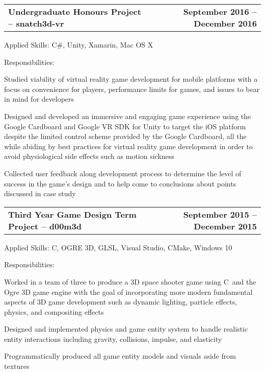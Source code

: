 \documentclass[10pt,letterpaper]{article}
\makeatletter
\newenvironment{indentsection}[1]%
{\begin{list}{}%
  {\setlength{\leftmargin}{#1}}%
  \item[]%
}
{\end{list}}
\newcommand{\headerrow}[2]
{\begin{tabular*}{\linewidth}{l@{\extracolsep{\fill}}r}
  #1 &
  #2 \\
\end{tabular*}}
\newcommand{\CPP}
{C\nolinebreak[4]\hspace{-.05em}\raisebox{.22ex}{\footnotesize\bf ++}}
\makeatother
\begin{document}
\begin{itemize}
  \item
  \headerrow
    {\textbf{Undergraduate Honours Project -- snatch3d-vr}}
    {\textbf{September 2016 -- December 2016}}
  \begin{indentsection}{1em}
    \begin{description*}
      \item[Applied Skills:]
      C\#, Unity, Xamarin, Mac OS X
      \item[Responsibilities:]
      \hfill
      \begin{itemize*}
        \item Studied viability of virtual reality game development for mobile
        platforms with a focus on convenience for players, performance limits for
        games, and issues to bear in mind for developers
        \item Designed and developed an immersive and engaging game experience
        using the Google Cardboard and Google VR SDK for Unity to target the iOS
        platform despite the limited control scheme provided by the Google
        Cardboard, all the while abiding by best practices for virtual reality
        game development in order to avoid physiological side effects such as
        motion sickness
        \item Collected user feedback along development process to determine the
        level of success in the game’s design and to help come to conclusions
        about points discussed in case study
      \end{itemize*}
    \end{description*}
  \end{indentsection}

  \item
  \headerrow
    {\textbf{Third Year Game Design Term Project -- d00m3d}}
    {\textbf{September 2015 -- December 2015}}
  \begin{indentsection}{1em}
    \begin{description*}
      \item[Applied Skills:]
      \CPP, OGRE 3D, GLSL, Visual Studio, CMake, Windows 10
      \item[Responsibilities:]
      \hfill
      \begin{itemize*}
        \item Worked in a team of three to produce a 3D space shooter game using
        \CPP\ and the Ogre 3D game engine with the goal of incorporating more
        modern fundamental aspects of 3D game development such as dynamic
        lighting, particle effects, physics, and compositing effects
        \item Designed and implemented physics and game entity system to handle
        realistic entity interactions including gravity, collisions, impulse, and
        elasticity
        \item Programmatically produced all game entity models and visuals aside
        from textures
      \end{itemize*}
    \end{description*}
  \end{indentsection}


\end{itemize}
\end{document}
